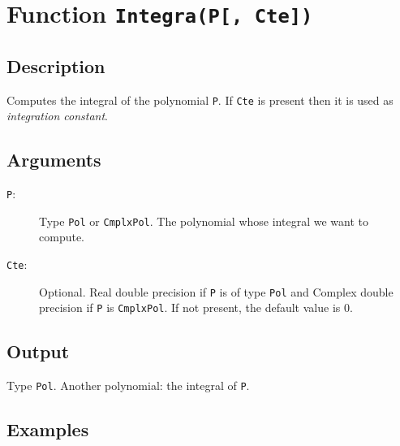 \section{Function \texttt{Integra(P[, Cte])}}

\subsection{Description}

Computes the integral of the polynomial \texttt{P}. If \texttt{Cte} is
present then it is used as \emph{integration constant}.

\subsection{Arguments}

\begin{description}
\item[\texttt{P}:] Type \texttt{Pol} or \texttt{CmplxPol}. The
  polynomial whose integral we want to compute.
\item[\texttt{Cte}:] Optional. Real double precision if \texttt{P} is
  of type \texttt{Pol} and Complex double precision if \texttt{P} is 
  \texttt{CmplxPol}. If not present, the default value is 0.
\end{description}

\subsection{Output}

Type \texttt{Pol}. Another polynomial: the integral of \texttt{P}.

\subsection{Examples}

